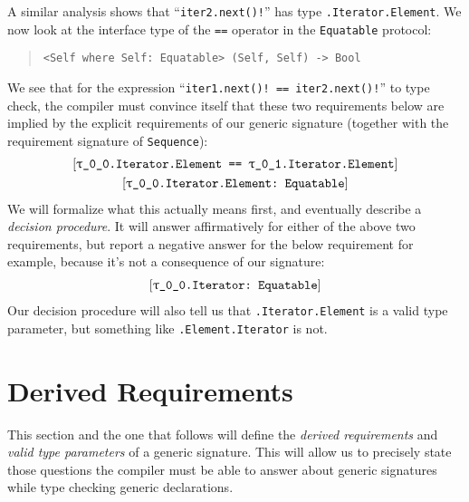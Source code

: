 \documentclass[../generics]{subfiles}
\begin{document}
\begin{example}
\begin{enumerate}
\end{enumerate}
A similar analysis shows that ``\verb|iter2.next()!|'' has type \texttt{\rU.Iterator.Element}. We now look at the interface type of the \texttt{==} operator in the \texttt{Equatable} protocol:
\begin{quote}
\begin{verbatim}
<Self where Self: Equatable> (Self, Self) -> Bool
\end{verbatim}
\end{quote}
We see that for the expression ``\verb|iter1.next()! == iter2.next()!|'' to type check, the compiler must convince itself that these two requirements below are implied by the explicit requirements of our generic signature (together with the requirement signature of \texttt{Sequence}):
\begin{gather*}
\SameReq{\rT.Iterator.Element}{\rU.Iterator.Element}\\
\ConfReq{\rT.Iterator.Element}{Equatable}
\end{gather*}
We will formalize what this actually means first, and eventually describe a \emph{decision procedure}. It will answer affirmatively for either of the above two requirements, but report a negative answer for the below requirement for example, because it's not a consequence of our signature:
\begin{gather*}
\ConfReq{\rT.Iterator}{Equatable}
\end{gather*}
Our decision procedure will also tell us that \texttt{\rT.Iterator.Element} is a valid type parameter, but something like \texttt{\rT.Element.Iterator} is not.
\end{example}

\section{Derived Requirements}\label{derived req}

This section and the one that follows will define the \emph{derived requirements} and \emph{valid type parameters} of a generic signature. This will allow us to precisely state those questions the compiler must be able to answer about generic signatures while type checking generic declarations.
\end{document}
